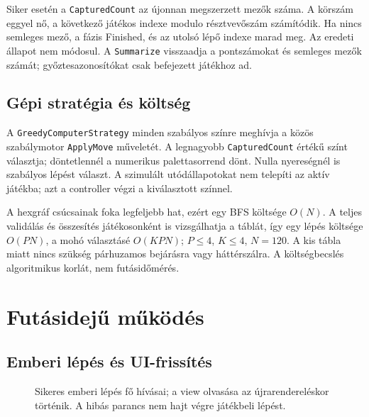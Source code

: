 \documentclass[11pt,a4paper]{article}
\newcommand{\code}[1]{\nolinkurl{#1}}
\begin{document}
Siker esetén a \code{CapturedCount} az újonnan megszerzett mezők száma. A körszám eggyel nő, a következő játékos indexe modulo résztvevőszám számítódik. Ha nincs semleges mező, a fázis Finished, és az utolsó lépő indexe marad meg. Az eredeti állapot nem módosul. A \code{Summarize} visszaadja a pontszámokat és semleges mezők számát; győztesazonosítókat csak befejezett játékhoz ad.

\subsection{Gépi stratégia és költség}
A \code{GreedyComputerStrategy} minden szabályos színre meghívja a közös szabálymotor \code{ApplyMove} műveletét. A legnagyobb \code{CapturedCount} értékű színt választja; döntetlennél a numerikus palettasorrend dönt. Nulla nyereségnél is szabályos lépést választ. A szimulált utódállapotokat nem telepíti az aktív játékba; azt a controller végzi a kiválasztott színnel.

A hexgráf csúcsainak foka legfeljebb hat, ezért egy BFS költsége $O(N)$. A teljes validálás és összesítés játékosonként is vizsgálhatja a táblát, így egy lépés költsége $O(PN)$, a mohó választásé $O(KPN)$; $P\leq4$, $K\leq4$, $N=120$. A kis tábla miatt nincs szükség párhuzamos bejárásra vagy háttérszálra. A költségbecslés algoritmikus korlát, nem futásidőmérés.

\section{Futásidejű működés}
\subsection{Emberi lépés és UI-frissítés}
\begin{figure}[htbp]\centering
{}
\caption{Sikeres emberi lépés fő hívásai; a view olvasása az újrarendereléskor történik. A hibás parancs nem hajt végre játékbeli lépést.}
\end{figure}
\end{document}
